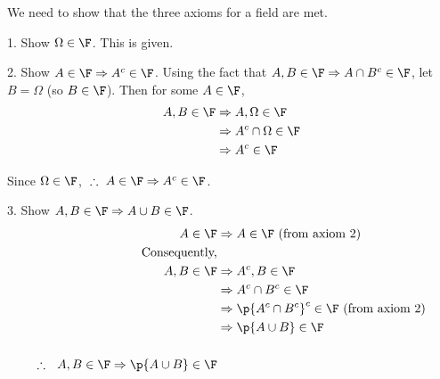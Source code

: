 We need to show that the three axioms for a field are met.

1. Show $\Omega \in \F$. This is given.

2. Show $A \in \F \Rightarrow A^c \in \F$. Using the fact that
$ A,B \in \F \Rightarrow A\cap B^c \in \F $,
let $B = \Omega$ (so $B \in \F$).
Then for some $A \in \F$, 
\begin{align*}
  A,B \in \F &\Rightarrow A,\Omega \in \F \\
  &\Rightarrow A^c \cap \Omega \in \F \\
  &\Rightarrow A^c \in \F \\
\end{align*}

Since $\Omega \in \F$, $~\therefore~ A \in \F \Rightarrow A^c \in \F$.

3. Show $A, B \in \F \Rightarrow A \cup B \in \F$.
\begin{align*}
  A \in \F &\Rightarrow A \in \F \text{ (from axiom 2)}\\
  \text{Consequently,}  \\
  A, B \in \F &\Rightarrow A^c, B \in \F \\
  &\Rightarrow A^c \cap B^c \in \F \\
  &\Rightarrow \p{A^c \cap B^c}^c \in \F \text{ (from axiom 2)}\\
  &\Rightarrow \p{A \cup B} \in \F \\
  \\
  \therefore ~~ A,B \in \F \Rightarrow \p{A \cup B} \in \F \\
\end{align*}


